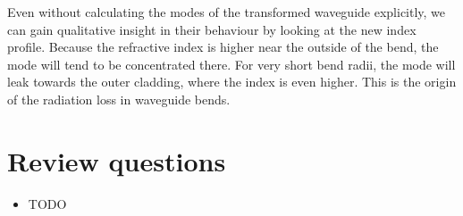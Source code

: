 Even without calculating the modes of the transformed waveguide explicitly, we
can gain qualitative insight in their behaviour by looking at the new index
profile. Because the refractive index  is higher near the outside of the bend,
the mode will tend to be concentrated there. For very short bend radii, the mode
will leak towards the outer cladding, where the index is even higher. This is
the origin of the radiation loss in waveguide bends.

\section*{Review questions}

\begin{itemize}
\item TODO
\end{itemize}

